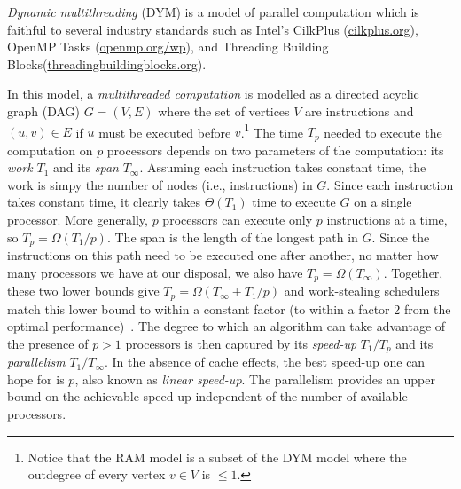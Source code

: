 {\em Dynamic multithreading} (DYM) \cite[Chapter 27]{Cormen2009} is a
model of parallel computation which is faithful to several industry standards
such as Intel's CilkPlus (\url{cilkplus.org}), OpenMP Tasks
(\url{openmp.org/wp}), and Threading Building
Blocks\break (\url{threadingbuildingblocks.org}).

In this model, a {\em multithreaded computation} is modelled as a directed
acyclic graph (DAG) $G=(V,E)$ where the set of vertices $V$ are instructions
and $(u,v) \in E$ if $u$ must be executed before $v$.\footnote{Notice that the
  RAM model is a subset of the DYM model where the outdegree of every
  vertex $v \in V$ is $\leq 1$.}
The time $T_p$ needed to execute the computation on $p$ processors depends on
two parameters of the computation: its {\em work} $T_1$ and its {\em span}
$T_\infty$.
Assuming each instruction takes constant time, the work is simpy the number of
nodes (i.e., instructions) in $G$.
Since each instruction takes constant time, it clearly takes $\Theta(T_1)$ time
to execute $G$ on a single processor.
More generally, $p$ processors can execute only $p$ instructions at a time, so
$T_p = \Omega(T_1/p)$.
The span is the length of the longest path in $G$.
Since the instructions on this path need to be executed one after another, no
matter how many processors we have at our disposal, we also have
$T_p = \Omega(T_\infty)$.
Together, these two lower bounds give $T_p = \Omega(T_\infty + T_1/p)$ and
work-stealing schedulers match this lower bound to within a constant factor
(to within a factor 2 from the optimal
performance)~\cite{Blumofe:1999:SMC:324133.324234}.
The degree to which an algorithm can take advantage of the presence of $p > 1$
processors is then captured by its {\em speed-up} $T_1 / T_p$ and its
{\em parallelism} $T_1 / T_\infty$.
In the absence of cache effects, the best speed-up one can hope for is $p$,
also known as {\em linear speed-up}.
The parallelism provides an upper bound on the achievable speed-up independent
of the number of available processors.

